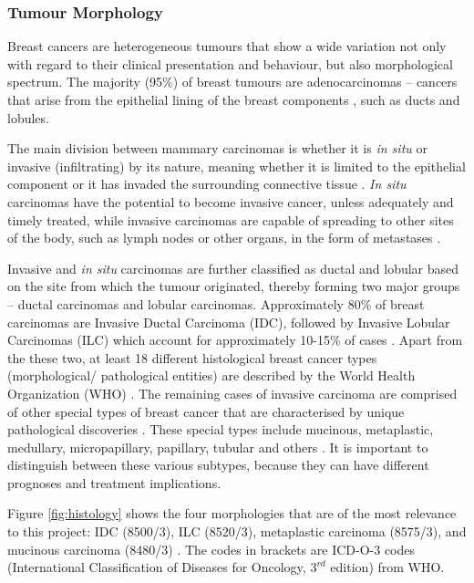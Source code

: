   \subsubsection{Tumour Morphology}
   
   
   Breast cancers are heterogeneous tumours that show a wide variation not only with regard to their clinical presentation and behaviour, but also morphological spectrum. The majority (95\%) of breast tumours are adenocarcinomas -- cancers that arise from the epithelial lining of the breast components \cite{Makki2015DiversityRelevance}, such as ducts and lobules.

    The main division between mammary carcinomas is whether it is \textit{in situ} or invasive (infiltrating) by its nature, meaning whether it is limited to the epithelial component or it has invaded the surrounding connective tissue \cite{Weigelt2008RefinementTypes}. \textit{In situ} carcinomas have the potential to become invasive cancer, unless adequately and timely treated, while invasive carcinomas are capable of spreading to other sites of the body, such as lymph nodes or other organs, in the form of metastases \cite{Makki2015DiversityRelevance}.

    Invasive and \textit{in situ} carcinomas are further classified as ductal and lobular based on the site from which the tumour originated, thereby forming two major groups --  ductal carcinomas and lobular carcinomas. Approximately 80\% of breast carcinomas are Invasive Ductal Carcinoma (IDC), followed by Invasive Lobular Carcinomas (ILC) which account for approximately 10-15\% of cases \cite{Weigelt2008RefinementTypes}. Apart from the these two, at least 18 different histological breast cancer types (morphological/ pathological entities) are described by the World Health Organization (WHO) \cite{walker2005world, 2011InternationalEd.}. The remaining cases of invasive carcinoma are comprised of other special types of breast cancer that are characterised by unique pathological discoveries \cite{Makki2015DiversityRelevance}. These special types include mucinous, metaplastic, medullary, micropapillary, papillary, tubular and others \cite{Weigelt2008RefinementTypes}. It is important to distinguish between these various subtypes, because they can have different prognoses and treatment implications.

    Figure \ref{fig:histology} shows the four morphologies that are of the most relevance to this project: IDC (8500/3), ILC (8520/3), metaplastic carcinoma (8575/3), and mucinous carcinoma (8480/3) \cite{Gathani2005BreastProgramme}. The codes in brackets are ICD-O-3 codes (International Classification of Diseases for Oncology, $3^{rd}$ edition) from WHO. 

